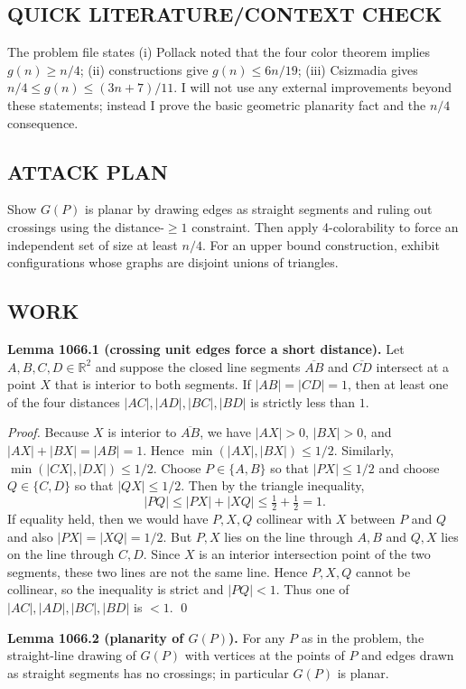 \subsection*{QUICK LITERATURE/CONTEXT CHECK}
The problem file states (i) Pollack noted that the four color theorem implies $g(n)\ge n/4$; (ii) constructions give $g(n)\le 6n/19$; (iii) Csizmadia gives $n/4\le g(n)\le (3n+7)/11$.  I will not use any external improvements beyond these statements; instead I prove the basic geometric planarity fact and the $n/4$ consequence.

\subsection*{ATTACK PLAN}
Show $G(P)$ is planar by drawing edges as straight segments and ruling out crossings using the distance-$\ge 1$ constraint.  Then apply 4-colorability to force an independent set of size at least $n/4$.  For an upper bound construction, exhibit configurations whose graphs are disjoint unions of triangles.

\subsection*{WORK}
\textbf{Lemma 1066.1 (crossing unit edges force a short distance).}
Let $A,B,C,D\in\mathbb{R}^2$ and suppose the closed line segments $\overline{AB}$ and $\overline{CD}$ intersect at a point $X$ that is interior to both segments.  If $|AB|=|CD|=1$, then at least one of the four distances $|AC|,|AD|,|BC|,|BD|$ is strictly less than $1$.

\emph{Proof.}
Because $X$ is interior to $\overline{AB}$, we have $|AX|>0$, $|BX|>0$, and $|AX|+|BX|=|AB|=1$. Hence $\min(|AX|,|BX|)\le 1/2$.  Similarly, $\min(|CX|,|DX|)\le 1/2$.
Choose $P\in\{A,B\}$ so that $|PX|\le 1/2$ and choose $Q\in\{C,D\}$ so that $|QX|\le 1/2$.
Then by the triangle inequality,
\[
|PQ| \le |PX|+|XQ| \le \tfrac12+\tfrac12 = 1.
\]
If equality held, then we would have $P,X,Q$ collinear with $X$ between $P$ and $Q$ and also $|PX|=|XQ|=1/2$.  But $P,X$ lies on the line through $A,B$ and $Q,X$ lies on the line through $C,D$.  Since $X$ is an interior intersection point of the two segments, these two lines are not the same line. Hence $P,X,Q$ cannot be collinear, so the inequality is strict and $|PQ|<1$.
Thus one of $|AC|,|AD|,|BC|,|BD|$ is $<1$. \qed

\textbf{Lemma 1066.2 (planarity of $G(P)$).}
For any $P$ as in the problem, the straight-line drawing of $G(P)$ with vertices at the points of $P$ and edges drawn as straight segments has no crossings; in particular $G(P)$ is planar.


